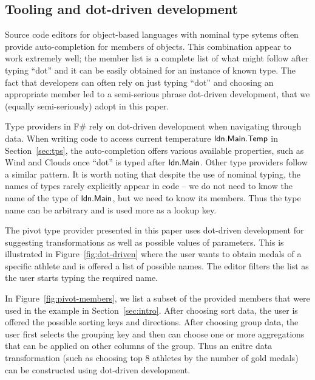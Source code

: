 \documentclass[a4paper,UKenglish]{lipics-v2016}
\theoremstyle{plain}
\theoremstyle{definition}
\newcommand{\ident}[1]{\textnormal{\sffamily #1}}
\newcommand{\qident}[1]{\textnormal{\sffamily \guillemotleft #1\guillemotright}}
\begin{document}
  
\subsection{Tooling and dot-driven development}
\label{sec:analysis-auto}

Source code editors for object-based languages with nominal type sytems often provide 
auto-completion for members of objects. This combination appear to work extremely well; the
member list is a complete list of what might follow after typing ``dot'' and it can be easily
obtained for an instance of known type. The fact that developers can often rely on just typing
``dot'' and choosing an appropriate member led to a semi-serious phrase dot-driven development,
that we (equally semi-seriously) adopt in this paper.

Type providers in F\# rely on dot-driven development when navigating through data. When writing code 
to access current temperature $\ident{ldn.Main.Temp}$ in Section~\ref{sec:tps}, the auto-completion
offers various available properties, such as \ident{Wind} and \ident{Clouds} once ``dot'' is typed
after $\ident{ldn.Main}$. Other type providers \cite{inforich} follow a similar pattern. It is worth noting
that despite the use of nominal typing, the names of types rarely explicitly appear in code -- we
do not need to know the name of the type of $\ident{ldn.Main}$, but we need to know its members.
Thus the type name can be arbitrary \cite{fsdata} and is used more as a lookup key.

The pivot type provider presented in this paper uses dot-driven development for suggesting 
transformations as well as possible values of parameters. This is illustrated in Figure~\ref{fig:dot-driven}
where the user wants to obtain medals of a specific athlete and is offered a list of possible 
names. The editor filters the list as the user starts typing the required name. 

In Figure~\ref{fig:pivot-members}, we list a subset of the provided members that were used in the
example in Section~\ref{sec:intro}. After choosing \qident{sort data}, the user is offered 
the possible sorting keys and directions. After choosing \qident{group data}, the user first 
selects the grouping key and then can choose one or more aggregations that can be applied on
other columns of the group. Thus an enitre data transformation (such as choosing top 8 athletes
by the number of gold medals) can be constructed using dot-driven development.
  
\end{document}
